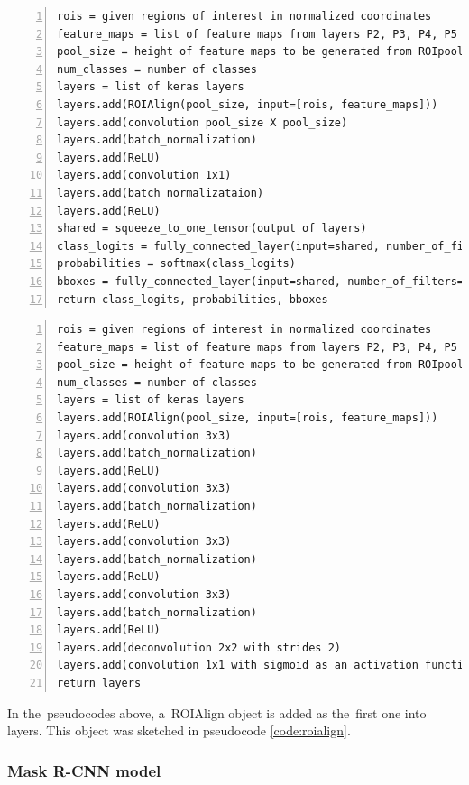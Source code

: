 {\scriptsize
\begin{lstlisting}[style=python, caption={fpn\_classifier\_graph}, captionpos=b, 
label=code:classifier, deletekeywords={from, input, map, in},
backgroundcolor = \color{light-gray}, numbers=left, breaklines=true]
rois = given regions of interest in normalized coordinates
feature_maps = list of feature maps from layers P2, P3, P4, P5
pool_size = height of feature maps to be generated from ROIpooling
num_classes = number of classes
layers = list of keras layers
layers.add(ROIAlign(pool_size, input=[rois, feature_maps]))
layers.add(convolution pool_size X pool_size)
layers.add(batch_normalization)
layers.add(ReLU)
layers.add(convolution 1x1)
layers.add(batch_normalizataion)
layers.add(ReLU)
shared = squeeze_to_one_tensor(output of layers)
class_logits = fully_connected_layer(input=shared, number_of_filters=num_classes)
probabilities = softmax(class_logits)
bboxes = fully_connected_layer(input=shared, number_of_filters=4 * num_classes)
return class_logits, probabilities, bboxes
\end{lstlisting}}

{\scriptsize
\begin{lstlisting}[style=python, caption={build\_fpn\_maskk\_graph}, 
captionpos=b, label=code:mask, deletekeywords={from, input, map, in},
backgroundcolor = \color{light-gray}, numbers=left, breaklines=true]
rois = given regions of interest in normalized coordinates
feature_maps = list of feature maps from layers P2, P3, P4, P5
pool_size = height of feature maps to be generated from ROIpooling
num_classes = number of classes
layers = list of keras layers
layers.add(ROIAlign(pool_size, input=[rois, feature_maps]))
layers.add(convolution 3x3)
layers.add(batch_normalization)
layers.add(ReLU)
layers.add(convolution 3x3)
layers.add(batch_normalization)
layers.add(ReLU)
layers.add(convolution 3x3)
layers.add(batch_normalization)
layers.add(ReLU)
layers.add(convolution 3x3)
layers.add(batch_normalization)
layers.add(ReLU)
layers.add(deconvolution 2x2 with strides 2)
layers.add(convolution 1x1 with sigmoid as an activation function)
return layers
\end{lstlisting}}

In the~pseudocodes above, a~ROIAlign object is added as the~first one into 
layers. This object was sketched in pseudocode \ref{code:roialign}.

\subsubsection{Mask R-CNN model}
\label{model-mrcnn}

